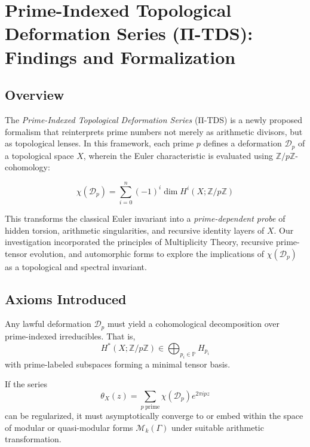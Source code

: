 \documentclass[12]{amsart}
\theoremstyle{plain}
\begin{document}
\section{Prime-Indexed Topological Deformation Series (Π-TDS): Findings and Formalization}

\subsection{Overview}

The \emph{Prime-Indexed Topological Deformation Series} (Π-TDS) is a newly proposed formalism that reinterprets prime numbers not merely as arithmetic divisors, but as topological lenses. In this framework, each prime $p$ defines a deformation $\mathcal{D}_p$ of a topological space $X$, wherein the Euler characteristic is evaluated using $\mathbb{Z}/p\mathbb{Z}$-cohomology:

\[
\chi(\mathcal{D}_p) = \sum_{i=0}^{n} (-1)^i \dim H^i(X; \mathbb{Z}/p\mathbb{Z})
\]

This transforms the classical Euler invariant into a \emph{prime-dependent probe} of hidden torsion, arithmetic singularities, and recursive identity layers of $X$. Our investigation incorporated the principles of Multiplicity Theory, recursive prime-tensor evolution, and automorphic forms to explore the implications of $\chi(\mathcal{D}_p)$ as a topological and spectral invariant.

\subsection{Axioms Introduced}

\begin{axiom}
Any lawful deformation $\mathcal{D}_p$ must yield a cohomological decomposition over prime-indexed irreducibles. That is,
\[
H^*(X; \mathbb{Z}/p\mathbb{Z}) \in \bigoplus_{p_i \in \mathbb{P}} H_{p_i}
\]
with prime-labeled subspaces forming a minimal tensor basis.
\end{axiom}

\begin{axiom}
If the series
\[
\theta_X(z) = \sum_{p\ \text{prime}} \chi(\mathcal{D}_p) e^{2\pi i p z}
\]
can be regularized, it must asymptotically converge to or embed within the space of modular or quasi-modular forms $\mathcal{M}_k(\Gamma)$ under suitable arithmetic transformation.

\end{axiom}
\end{document}
